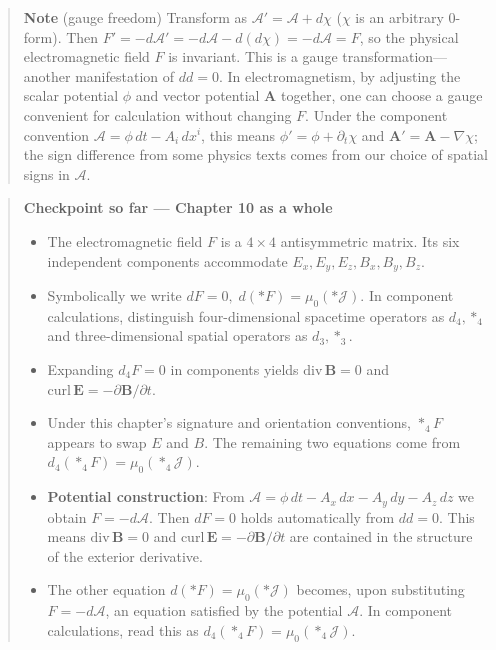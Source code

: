 \documentclass[a4paper,12pt,openany]{book}
\begin{document}
\begin{quote}
\textbf{Note} (gauge freedom) Transform as
\(\mathcal{A}'=\mathcal{A}+d\chi\) (\(\chi\) is an arbitrary
\(0\)-form). Then
\(F'=-d\mathcal{A}'=-d\mathcal{A}-d(d\chi)=-d\mathcal{A}=F\), so the
physical electromagnetic field \(F\) is invariant. This is a gauge
transformation—another manifestation of \(dd=0\). In electromagnetism,
by adjusting the scalar potential \(\phi\) and vector potential
\(\mathbf{A}\) together, one can choose a gauge convenient for
calculation without changing \(F\). Under the component convention
\(\mathcal{A}=\phi\,dt-A_i\,dx^i\), this means
\(\phi'=\phi+\partial_t\chi\) and \(\mathbf{A}'=\mathbf{A}-\nabla\chi\);
the sign difference from some physics texts comes from our choice of
spatial signs in \(\mathcal{A}\).
\end{quote}

\begin{quote}
\textbf{Checkpoint so far — Chapter 10 as a whole}

\begin{itemize}
\item
  The electromagnetic field \(F\) is a \(4\times4\) antisymmetric
  matrix. Its six independent components accommodate
  \(E_x,E_y,E_z,B_x,B_y,B_z\).
\item
  Symbolically we write \(dF=0,\;d(\ast F)=\mu_0(\ast\mathcal{J})\). In
  component calculations, distinguish four-dimensional spacetime
  operators as \(d_4,\ast_4\) and three-dimensional spatial operators as
  \(d_3,\ast_3\).
\item
  Expanding \(d_4F=0\) in components yields
  \(\mathrm{div}\,\mathbf{B}=0\) and
  \(\mathrm{curl}\,\mathbf{E}=-\partial\mathbf{B}/\partial t\).
\item
  Under this chapter's signature and orientation conventions,
  \(\ast_4F\) appears to swap \(E\) and \(B\). The remaining two
  equations come from \(d_4(\ast_4F)=\mu_0(\ast_4\mathcal{J})\).
\item
  \textbf{Potential construction}: From
  \(\mathcal{A}=\phi\,dt-A_x\,dx-A_y\,dy-A_z\,dz\) we obtain
  \(F=-d\mathcal{A}\). Then \(dF=0\) holds automatically from \(dd=0\).
  This means \(\mathrm{div}\,\mathbf{B}=0\) and
  \(\mathrm{curl}\,\mathbf{E}=-\partial\mathbf{B}/\partial t\) are
  contained in the structure of the exterior derivative.
\item
  The other equation \(d(\ast F)=\mu_0(\ast\mathcal{J})\) becomes, upon
  substituting \(F=-d\mathcal{A}\), an equation satisfied by the
  potential \(\mathcal{A}\). In component calculations, read this as
  \(d_4(\ast_4F)=\mu_0(\ast_4\mathcal{J})\).
\end{itemize}
\end{quote}
\end{document}
